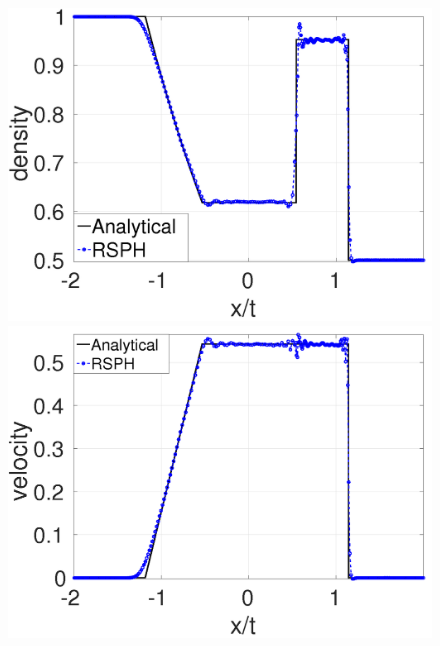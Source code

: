 \documentclass[review]{elsarticle}
\begin{document}
\begin{figure}[H]
    \centering
    \begin{minipage}{.415\textwidth}
        \centering
        \includegraphics[width=0.99 \textwidth]{./Figures/GRod-RCM-rho}
    \end{minipage}%
    \begin{minipage}{.415 \textwidth}
        \centering
        \includegraphics[width=0.99 \textwidth]{./Figures/GRod-RCM-v}
    \end{minipage}%
    \\
    \begin{minipage}{.415\textwidth}
        \centering

\end{minipage}
\end{figure}
\end{document}
